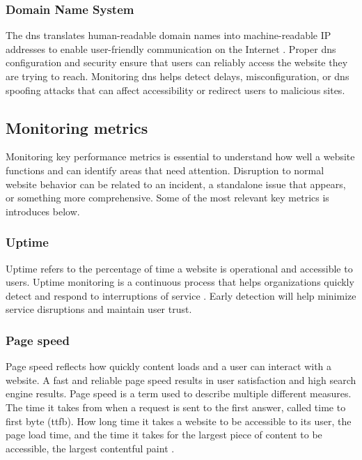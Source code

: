 \subsubsection{Domain Name System}
\label{subsubsec:domain_name_system}


The \acrfull{dns} translates human-readable domain names into machine-readable IP addresses to enable user-friendly communication on the Internet \autocite{DNS}. Proper \acrshort{dns} configuration and security ensure that users can reliably access the website they are trying to reach. Monitoring \acrshort{dns} helps detect delays, misconfiguration, or \acrshort{dns} spoofing attacks that can affect accessibility or redirect users to malicious sites. 

\subsection{Monitoring metrics}
\label{subsec:monitoring_metrics}


Monitoring key performance metrics is essential to understand how well a website functions and can identify areas that need attention. Disruption to normal website behavior can be related to an incident, a standalone issue that appears, or something more comprehensive. Some of the most relevant key metrics is introduces below.

\subsubsection{Uptime}
\label{subsubsec:uptime}


Uptime refers to the percentage of time a website is operational and accessible to users. Uptime monitoring is a continuous process that helps organizations quickly detect and respond to interruptions of service \autocite{IBMwebmonitor}. Early detection will help minimize service disruptions and maintain user trust. 


\subsubsection{Page speed}
\label{subsubsec:page_speed}


Page speed reflects how quickly content loads and a user can interact with a website. A fast and reliable page speed results in user satisfaction and high search engine results. Page speed is a term used to describe multiple different measures. The time it takes from when a request is sent to the first answer, called time to first byte (\acrshort{ttfb}). How long time it takes a website to be accessible to its user, the page load time, and the time it takes for the largest piece of content to be accessible, the largest contentful paint \autocite{IBMwebmonitor}.

